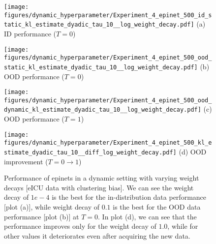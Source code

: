 \begin{figure}[h]
\centering
\begin{minipage}[b]{0.24\textwidth}
\centering
\texttt{[image: figures/dynamic\_hyperparameter/Experiment\_4\_epinet\_500\_id\_static\_kl\_estimate\_dyadic\_tau\_10\_\_log\_weight\_decay.pdf]}
{\small{{(a)} ID performance ($T=0$) }}
\end{minipage}
\hfill
\begin{minipage}[b]{0.24\textwidth}
\centering \texttt{[image: figures/dynamic\_hyperparameter/Experiment\_4\_epinet\_500\_ood\_static\_kl\_estimate\_dyadic\_tau\_10\_\_log\_weight\_decay.pdf]}
{\small{{(b)} OOD performance ($T=0$) }}
\end{minipage}
\hfill
\begin{minipage}[b]{0.24\textwidth}
\centering \texttt{[image: figures/dynamic\_hyperparameter/Experiment\_4\_epinet\_500\_ood\_dynamic\_kl\_estimate\_dyadic\_tau\_10\_\_log\_weight\_decay.pdf]}
{\small{{(c)} OOD performance ($T=1$) }}
\end{minipage}
\hfill
\begin{minipage}[b]{0.24\textwidth}
\centering \texttt{[image: figures/dynamic\_hyperparameter/Experiment\_4\_epinet\_500\_kl\_estimate\_dyadic\_tau\_10\_\_diff\_log\_weight\_decay.pdf]}
{\small{{(d)} OOD improvement ($T=0 \to 1$) }}
\end{minipage}
\caption{Performance of epinets in a dynamic setting with varying weight decays [eICU data with clustering bias].
We can see the weight decay of $1e-4$ is the best for the in-distribution data performance [plot (a)], while  weight decay of $0.1$ is the best for the OOD data performance [plot (b)] at $T=0$.  
In plot (d), we can see that the performance improves only for the weight decay of $1.0$, while for other values it deteriorates even after acquiring the new data. 
}
\label{fig:Epinet_weight_decay}
\end{figure}




